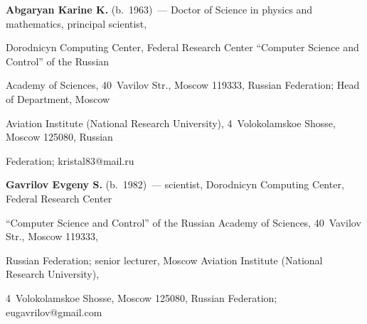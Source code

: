 \Contr





\noindent


\textbf{Abgaryan Karine K.} (b.\ 1963)~--- Doctor of Science in physics and mathematics, principal scientist, 


Dorodnicyn Computing Center, Federal Research Center ``Computer Science and Control'' of the Russian 


Academy of Sciences, 40~Vavilov Str., Moscow 119333, Russian Federation; Head of Department, Moscow 


Aviation Institute (National Research University), 4~Volokolamskoe Shosse, Moscow 125080, Russian 


Federation; \mbox{kristal83@mail.ru}





\vspace*{3pt}





\noindent


\textbf{Gavrilov Evgeny S.} (b.\ 1982)~--- scientist, Dorodnicyn Computing Center, Federal Research Center 


``Computer Science and Control'' of the Russian Academy of Sciences, 40~Vavilov Str., Moscow 119333, 


Russian Federation; senior lecturer, Moscow Aviation Institute (National Research University), 


4~Volokolamskoe Shosse, Moscow 125080, Russian Federation; \mbox{eugavrilov@gmail.com}


\label{end\stat}





\renewcommand{\bibname}{\protect\rm Литература} 


